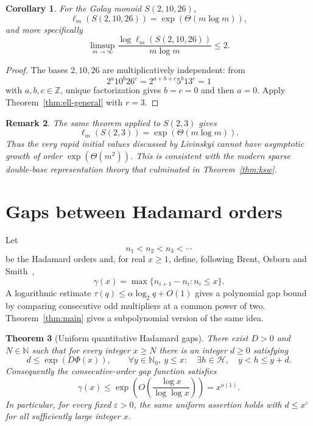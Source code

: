 \documentclass[11pt]{article}
\newtheorem{theorem}{Theorem}[section]
\newtheorem{corollary}[theorem]{Corollary}
\newtheorem{remark}[theorem]{Remark}
\newcommand{\Hcal}{\mathcal{H}}
\newcommand{\N}{\mathbb{N}}
\newcommand{\scale}{\Phi}
\begin{document}
\begin{corollary}\label{cor:ell-21026}
For the Golay monoid $S(2,10,26)$,
\[
\ell_m(S(2,10,26))=\exp(\Theta(m\log m)),
\]
and more specifically
\[
\limsup_{m\to\infty}
\frac{\log \ell_m(S(2,10,26))}{m\log m}\le2.
\]
\end{corollary}

\begin{proof}
The bases $2,10,26$ are multiplicatively independent: from
\[
2^a10^b26^c=2^{a+b+c}5^b13^c=1
\]
with $a,b,c\in\mathbb Z$, unique factorization gives $b=c=0$ and then $a=0$.  Apply Theorem~\ref{thm:ell-general} with $r=3$.
\end{proof}

\begin{remark}
The same theorem applied to $S(2,3)$ gives
\[
\ell_m(S(2,3))=\exp(\Theta(m\log m)).
\]
Thus the very rapid initial values discussed by Livinskyi cannot have asymptotic growth of order $\exp(\Theta(m^2))$.  This is consistent with the modern sparse double-base representation theory that culminated in Theorem~\ref{thm:ksw}.
\end{remark}

\section{Gaps between Hadamard orders}\label{sec:gaps}
Let
\[
n_1<n_2<n_3<\cdots
\]
be the Hadamard orders and, for real $x\ge1$, define, following Brent, Osborn and Smith~\cite{Brent2013},
\[
\gamma(x)=\max\{n_{i+1}-n_i:n_i\le x\}.
\]
A logarithmic estimate $\tau(q)\le\alpha\log_2q+O(1)$ gives a polynomial gap bound by comparing consecutive odd multipliers at a common power of two.  Theorem~\ref{thm:main} gives a subpolynomial version of the same idea.

\begin{theorem}[Uniform quantitative Hadamard gaps]\label{thm:gaps}
There exist $D>0$ and $N\in\N$ such that for every integer $x\ge N$ there
is an integer $d\ge0$ satisfying
\begin{equation}\label{eq:uniform-gap}
d\le\exp(D\scale(x)),\qquad
\forall y\in\N_0,\ y\le x:\quad
\exists h\in\Hcal,\quad y<h\le y+d.
\end{equation}
Consequently the consecutive-order gap function satisfies
\begin{equation}\label{eq:gap}
\gamma(x)\le\exp\!\left(O\!\left(\frac{\log x}{\log\log x}\right)\right)
=x^{o(1)}.
\end{equation}
In particular, for every fixed $\varepsilon>0$, the same uniform assertion
holds with $d\le x^{\varepsilon}$ for all sufficiently large integer $x$.
\end{theorem}
\end{document}
